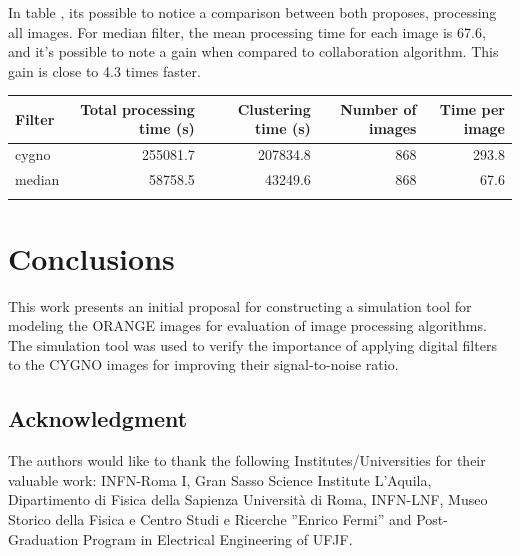 \documentclass[
        oneside,      %
        english,			
        brazil			 
        ]{abntbibufjf}
\begin{document}
In table \label{final_time}, its possible to notice a comparison between both proposes, processing all images. For median filter, the mean processing time for each image is 67.6, and it's possible to note a gain when compared to collaboration algorithm. This gain is close to 4.3 times faster.


\begin{tabular}{lrrrr}
\toprule
 Filter &  Total processing time (s) &  Clustering time (s) &  Number of images &  Time per image \\
\midrule
  cygno &              255081.7 &        207834.8 &               868 &      293.8 \\
 median &               58758.5 &         43249.6 &               868 &       67.6 \\
\bottomrule
\label{final_time}
\end{tabular}

\chapter{Conclusions}\label{chap:conclusions}


This work presents an initial proposal for constructing a simulation tool for modeling the ORANGE images for evaluation of image processing algorithms. The simulation tool was used to verify the importance of applying digital filters to the CYGNO images for improving their signal-to-noise ratio.



\section*{Acknowledgment}
The authors would like to thank the following Institutes/Universities for their valuable work: INFN-Roma I, Gran Sasso Science Institute L’Aquila, Dipartimento di Fisica della Sapienza Università di Roma, INFN-LNF, Museo Storico della Fisica e Centro Studi e Ricerche ”Enrico Fermi” and Post-Graduation Program in Electrical Engineering of UFJF.


\postextual 



\end{document}
